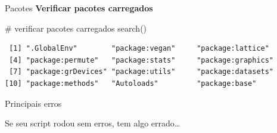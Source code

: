 \documentclass[
  ignorenonframetext,
]{beamer}
\newenvironment{Shaded}{\begin{snugshade}}{\end{snugshade}}
\newcommand{\CommentTok}[1]{\textcolor[rgb]{0.37,0.37,0.37}{#1}}
\newcommand{\FunctionTok}[1]{\textcolor[rgb]{0.28,0.35,0.67}{#1}}
\newcommand{\NormalTok}[1]{\textcolor[rgb]{0.00,0.23,0.31}{#1}}
\begin{document}
\begin{frame}[fragile]
\begin{block}{Pacotes}
\textbf{Verificar pacotes carregados}

\begin{Shaded}
\begin{Highlighting}[]
\CommentTok{\# verificar pacotes carregados}
\FunctionTok{search}\NormalTok{()}
\end{Highlighting}
\end{Shaded}

\begin{verbatim}
 [1] ".GlobalEnv"        "package:vegan"     "package:lattice"  
 [4] "package:permute"   "package:stats"     "package:graphics" 
 [7] "package:grDevices" "package:utils"     "package:datasets" 
[10] "package:methods"   "Autoloads"         "package:base"     
\end{verbatim}
\end{block}
\end{frame}

\begin{frame}{Principais erros}
\protect\hypertarget{principais-erros}{}
\end{frame}

\begin{frame}{Se seu script rodou sem erros, tem algo errado\ldots{}}
\protect\hypertarget{se-seu-script-rodou-sem-erros-tem-algo-errado}{}
\end{frame}

\begin{frame}{}
\protect\hypertarget{section-3}{}
\end{frame}

\begin{frame}{}
\protect\hypertarget{section-4}{}
\end{frame}

\begin{frame}{}
\protect\hypertarget{section-5}{}
\end{frame}
\end{document}
